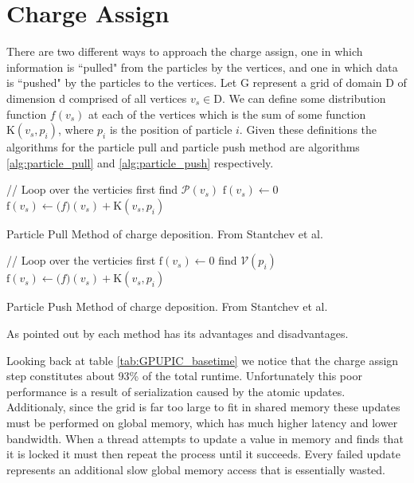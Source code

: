 	\section{Charge Assign}

There are two different ways to approach the charge assign, one in which information is ``pulled" from the particles by the vertices, and one in which data is ``pushed" by the particles to the vertices. Let G represent a grid of domain D of dimension d comprised of all vertices $v_s  \in \mathrm{D}$. We can define some distribution function $f(v_s)$ at each of the vertices which is the sum of some function $\mathrm{K}(v_s,p_i)$, where $p_i$ is the position of particle $i$. Given these definitions the algorithms for the particle pull and particle push method are algorithms \ref{alg:particle_pull} and \ref{alg:particle_push} respectively. 

\begin{algorithm}
	\begin{algorithmic}
		\STATE // Loop over the verticies first
			\STATE find $\mathcal{P}(v_s)$
			\STATE $\mathrm{f}(v_s) \leftarrow 0$
			\STATE $\mathrm{f}(v_s) \leftarrow \mathrm(f)(v_s) + \mathrm{K}(v_s,p_i)$
			\ENDFOR
		\ENDFOR
	\end{algorithmic}
	\caption{Particle Pull Method of charge deposition. From Stantchev et al. \cite{Stantchev2008}}
	\label{alg:particle_pull}
\end{algorithm}

\begin{algorithm}
	\begin{algorithmic}
		\STATE // Loop over the verticies first
		\FORALL{$\mathrm{vertex} \: v_s \in G$}
			\STATE $\mathrm{f}(v_s) \leftarrow 0$
		\ENDFOR
		\FORALL{$\mathrm{particle} \: p_i \in \mathrm{D}$}
			\STATE find $\mathcal{V}(p_i)$
			\FORALL{$v_s \in \mathcal{V}(p_i)$}
				\STATE $\mathrm{f}(v_s) \leftarrow \mathrm(f)(v_s) + \mathrm{K}(v_s,p_i)$
			\ENDFOR
		\ENDFOR
	\end{algorithmic}
	\caption{Particle Push Method of charge deposition. From Stantchev et al. \cite{Stantchev2008}}
	\label{alg:particle_push}
\end{algorithm}

As pointed out by \cite{Stantchev2008} each method has its advantages and disadvantages. 


Looking back at table \ref{tab:GPUPIC_basetime} we notice that the charge assign step constitutes about 93\% of the total runtime.  Unfortunately this poor performance is a result of serialization caused by the atomic updates. Additionaly, since the grid is far too large to fit in shared memory these updates must be performed on global memory, which has much higher latency and lower bandwidth. When a thread attempts to update a value in memory and finds that it is locked it must then repeat the process until it succeeds. Every failed update represents an additional slow global memory access that is essentially wasted. 

